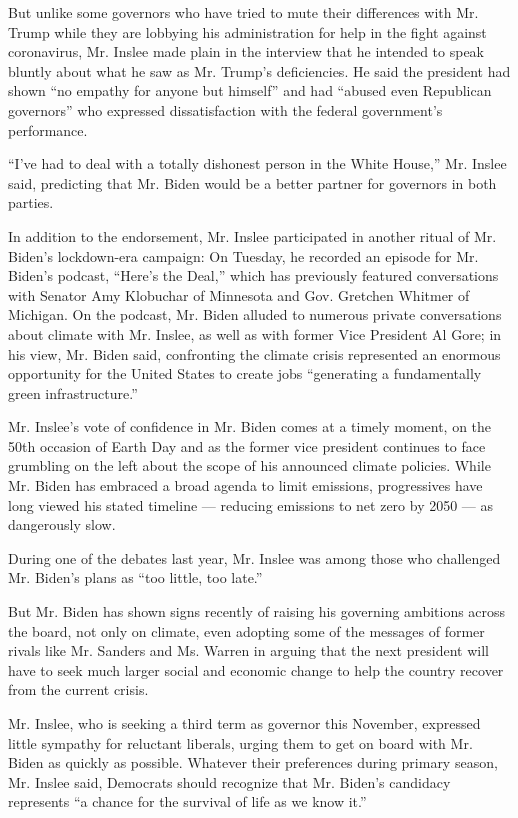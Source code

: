 But unlike some governors who have tried to mute their differences with
Mr. Trump while they are lobbying his administration for help in the
fight against coronavirus, Mr. Inslee made plain in the interview that
he intended to speak bluntly about what he saw as Mr. Trump's
deficiencies. He said the president had shown ``no empathy for anyone
but himself'' and had ``abused even Republican governors'' who expressed
dissatisfaction with the federal government's performance.

``I've had to deal with a totally dishonest person in the White House,''
Mr. Inslee said, predicting that Mr. Biden would be a better partner for
governors in both parties.

In addition to the endorsement, Mr. Inslee participated in another
ritual of Mr. Biden's lockdown-era campaign: On Tuesday, he recorded an
episode for Mr. Biden's podcast, ``Here's the Deal,'' which has
previously featured conversations with Senator Amy Klobuchar of
Minnesota and Gov. Gretchen Whitmer of Michigan. On the podcast, Mr.
Biden alluded to numerous private conversations about climate with Mr.
Inslee, as well as with former Vice President Al Gore; in his view, Mr.
Biden said, confronting the climate crisis represented an enormous
opportunity for the United States to create jobs ``generating a
fundamentally green infrastructure.''

Mr. Inslee's vote of confidence in Mr. Biden comes at a timely moment,
on the 50th occasion of Earth Day and as the former vice president
continues to face grumbling on the left about the scope of his announced
climate policies. While Mr. Biden has embraced a broad agenda to limit
emissions, progressives have long viewed his stated timeline ---
reducing emissions to net zero by 2050 --- as dangerously slow.

During one of the debates last year, Mr. Inslee was among those who
challenged Mr. Biden's plans as ``too little, too late.''

But Mr. Biden has shown signs recently of raising his governing
ambitions across the board, not only on climate, even adopting some of
the messages of former rivals like Mr. Sanders and Ms. Warren in arguing
that the next president will have to seek much larger social and
economic change to help the country recover from the current crisis.

Mr. Inslee, who is seeking a third term as governor this November,
expressed little sympathy for reluctant liberals, urging them to get on
board with Mr. Biden as quickly as possible. Whatever their preferences
during primary season, Mr. Inslee said, Democrats should recognize that
Mr. Biden's candidacy represents ``a chance for the survival of life as
we know it.''

